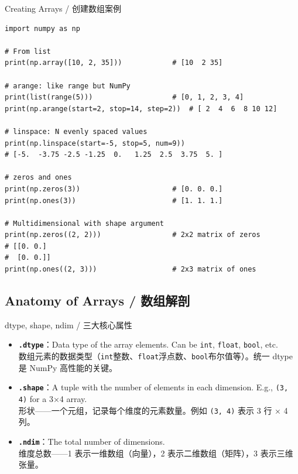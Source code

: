\documentclass[11pt,a4paper]{report}
\let\oldtexttt\texttt
\renewcommand{\texttt}[1]{\textcolor{mainblue}{\oldtexttt{#1}}}
\begin{document}
\begin{examplebox}{Creating Arrays / 创建数组案例}
\begin{lstlisting}
import numpy as np

# From list
print(np.array([10, 2, 35]))            # [10  2 35]

# arange: like range but NumPy
print(list(range(5)))                   # [0, 1, 2, 3, 4]
print(np.arange(start=2, stop=14, step=2))  # [ 2  4  6  8 10 12]

# linspace: N evenly spaced values
print(np.linspace(start=-5, stop=5, num=9))
# [-5.  -3.75 -2.5 -1.25  0.   1.25  2.5  3.75  5. ]

# zeros and ones
print(np.zeros(3))                      # [0. 0. 0.]
print(np.ones(3))                       # [1. 1. 1.]

# Multidimensional with shape argument
print(np.zeros((2, 2)))                 # 2x2 matrix of zeros
# [[0. 0.]
#  [0. 0.]]
print(np.ones((2, 3)))                  # 2x3 matrix of ones
\end{lstlisting}
\end{examplebox}

\subsection{Anatomy of Arrays / 数组解剖}

\begin{concept}{dtype, shape, ndim / 三大核心属性}
    \begin{itemize}[itemsep=0.5em]
        \item \textbf{\texttt{.dtype}}：Data type of the array elements. Can be \texttt{int}, \texttt{float}, \texttt{bool}, etc. \\
        数组元素的数据类型（\texttt{int}整数、\texttt{float}浮点数、\texttt{bool}布尔值等）。统一 dtype 是 NumPy 高性能的关键。
        \item \textbf{\texttt{.shape}}：A tuple with the number of elements in each dimension. E.g., \texttt{(3, 4)} for a 3×4 array. \\
        形状——一个元组，记录每个维度的元素数量。例如 \texttt{(3, 4)} 表示 3 行 × 4 列。
        \item \textbf{\texttt{.ndim}}：The total number of dimensions. \\
        维度总数——1 表示一维数组（向量），2 表示二维数组（矩阵），3 表示三维张量。
    \end{itemize}
\end{concept}
\end{document}
